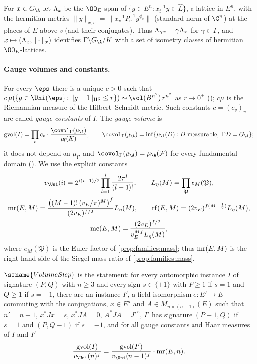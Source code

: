 For $x\in\rowsGA$ let $\Lambda_x$ be the $\OO_E$-span of $\{y\in E^n: x_{\mathrm f}^{-1}y\in\hat L\}$, a lattice in $E^n$,
with the hermitian metrics $\|y\|_{x,v}=\|x_v^{-1}P_v^{-1}y^{\phi_v}\|$ (standard norm of $\C^n$) at the places of $E$
above $v$ (and their conjugates). Thus $\Lambda_{\gamma x}=\gamma\Lambda_x$ for $\gamma\in\Gamma$, and $x\mapsto(\Lambda_x,\|\cdot\|_x)$
identifies $\Gamma\backslash\rowsGA/K$ with a set of isometry classes of hermitian $\OO_E$-lattices.

\paragraph{Gauge volumes and constants.}
For every $\eps$ there is a unique $c>0$ such that
$c\,\mu(\{g\in\Uni(\eps):\|g-1\|_{\mathrm{HS}}\le r\})\sim \vol(B^{n^2})\,r^{n^2}$ as $r\to0^+$
(); $c\mu$ is the Riemannian measure of the
Hilbert--Schmidt metric. Such constants $c=(c_v)_v$ are called \emph{gauge constants} of $I$. The \emph{gauge volume}
is
\[
\rowsgv(I)=\prod_vc_v\cdot\frac{\covol_\Gamma(\mu_{\A})}{\mu_{\mathrm f}(K)},\qquad
\covol_\Gamma(\mu_{\A})=\inf\{\mu_{\A}(D):D\text{ measurable},\ \Gamma D=\rowsGA\};
\]
it does not depend on $\mu_{\mathrm f}$, and $\covol_\Gamma(\mu_{\A})=\mu_{\A}(\mathcal F)$ for every fundamental domain
(). We use the explicit constants
\begin{gather*}
\rowsvU(i)=2^{i(i-1)/2}\prod_{l=1}^{i}\frac{2\pi^l}{(l-1)!},\qquad
L_\eta(M)=\prod_{\mathfrak P}e_M(\mathfrak P),\\
\rowsmr(E,M)=\frac{\bigl((M-1)!\,(v_E/\pi)^M\bigr)^f}{(2v_E)^{f/2}}L_\eta(M),\qquad
\rowsrf(E,M)=(2v_E)^{f(M-\frac12)}L_\eta(M),\\
\rowsmc(E,M)=\frac{(2v_E)^{f/2}}{v_E^{Mf}L_\eta(M)},
\end{gather*}
where $e_M(\mathfrak P)$ is the Euler factor of \cref{prop:families:mass}; thus $\operatorname{mr}(E,M)$ is the right-hand side of
the Siegel mass ratio of \cref{prop:families:mass}.

\begin{definition}\label{pf:rows:defvolstep}
$\sfname{VolumeStep}$ is the statement: for every automorphic instance $I$ of signature $(P,Q)$ with $n\ge3$ and
every sign $s\in\{\pm1\}$ with $P\ge1$ if $s=1$ and $Q\ge1$ if $s=-1$, there are an instance $I'$, a field isomorphism
$e:E'\to E$ commuting with the conjugations, $x\in E^n$ and $A\in M_{n\times(n-1)}(E)$ such that $n'=n-1$,
$x^*Jx=s$, $x^*JA=0$, $A^*JA=J'^{\,e}$, $I'$ has signature $(P-1,Q)$ if $s=1$ and $(P,Q-1)$ if $s=-1$, and for all
gauge constants and Haar measures of $I$ and $I'$
\[
\frac{\rowsgv(I)}{\rowsvU(n)^f}=\frac{\rowsgv(I')}{\rowsvU(n-1)^f}\cdot\rowsmr(E,n).
\]
\end{definition}

